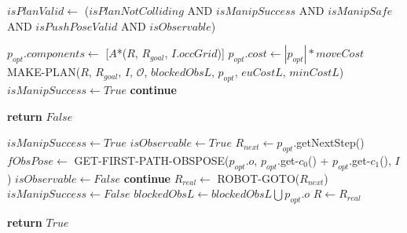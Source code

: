\begin{algorithm}[H]
\begin{algorithmic}[1]
        \State $isPlanValid \gets$ ($isPlanNotColliding$ AND $isManipSuccess$ AND $isManipSafe$ AND $isPushPoseValid$ AND $isObservable$)

          \State $p_{opt}.components \gets$ [$A$*($R$, $R_{goal}$, $I.occGrid$)]
          \State $p_{opt}.cost \gets |p_{opt}| * moveCost$
        \EndIf
          \State MAKE-PLAN($R$, $R_{goal}$, $I$, $\mathcal{O}$, $blockedObsL$, $p_{opt}$, $euCostL$, $minCostL$)
          \State $isManipSuccess \gets True$
          \State \textbf{continue}
        \EndIf


  \end{algorithmic}
\end{algorithm}

\begin{algorithm}[H]

  \label{alg:07-custom-merge-makeandexecuteplan-part2}

  \begin{algorithmic}[1]


          \State \textbf{return} $False$
        \EndIf

        \State $isManipSuccess \gets True$
        \State $isObservable \gets True$
        \State $R_{next} \gets p_{opt}$.getNextStep()
          \State $fObsPose \gets$ GET-FIRST-PATH-OBSPOSE($p_{opt}.o$, $p_{opt}$.get-$c_{0}$() + $p_{opt}$.get-$c_{1}$(), $I$)
            \State $isObservable \gets False$
            \State \textbf{continue}
          \EndIf
        \EndIf
        \State $R_{real} \gets$ ROBOT-GOTO($R_{next}$)
          \State $isManipSuccess \gets False$
          \State $blockedObsL \gets blockedObsL \bigcup p_{opt}.o$
        \EndIf
        \State $R \gets R_{real}$

      \EndWhile

      \State \textbf{return} $True$

    \EndProcedure

  \end{algorithmic}
\end{algorithm}
